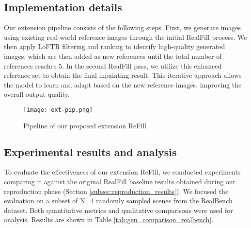 \documentclass{article}
\begin{document}
\subsection{Implementation details}
\label{subsec:extension_implementation}
Our extension pipeline consists of the following steps. First, we generate images using existing real-world reference images through the initial RealFill process. We then apply LoFTR filtering and ranking to identify high-quality generated images, which are then added as new references until the total number of references reaches 5. In the second RealFill pass, we utilize this enhanced reference set to obtain the final inpainting result. This iterative approach allows the model to learn and adapt based on the new reference images, improving the overall output quality.
\begin{figure}[H]
    \centering
    \texttt{[image: ext-pip.png]}
    \caption{Pipeline of our proposed extension ReFill}
    \label{fig: extension_pipeline}
\end{figure}

\subsection{Experimental results and analysis}
\label{subsec:ref_supplement_analysis}
To evaluate the effectiveness of our extension ReFill, we conducted experiments comparing it against the original RealFill baseline results obtained during our reproduction phase (Section \ref{subsec:reproduction_results}). We focused the evaluation on a subset of N=4 randomly sampled scenes from the RealBench dataset. Both quantitative metrics and qualitative comparisons were used for analysis. Results are shown in Table \ref{tab:gen_comparison_realbench}.
\end{document}
